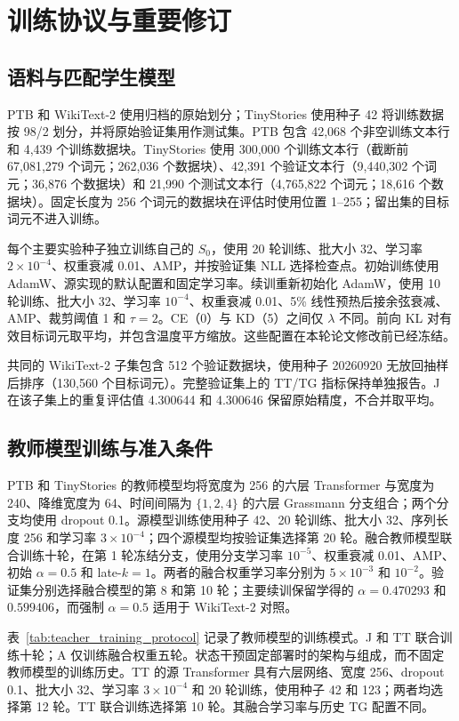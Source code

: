 \section{训练协议与重要修订}\label{app:protocols}

\subsection{语料与匹配学生模型}
PTB 和 WikiText-2 使用归档的原始划分；TinyStories 使用种子 42 将训练数据按 98/2 划分，并将原始验证集用作测试集。PTB 包含 42,068 个非空训练文本行和 4,439 个训练数据块。TinyStories 使用 300,000 个训练文本行（截断前 67,081,279 个词元；262,036 个数据块）、42,391 个验证文本行（9,440,302 个词元；36,876 个数据块）和 21,990 个测试文本行（4,765,822 个词元；18,616 个数据块）。固定长度为 256 个词元的数据块在评估时使用位置 1--255；留出集的目标词元不进入训练。

每个主要实验种子独立训练自己的 $S_0$，使用 20 轮训练、批大小 32、学习率 $2\times10^{-4}$、权重衰减 0.01、AMP，并按验证集 NLL 选择检查点。初始训练使用 AdamW、源实现的默认配置和固定学习率。续训重新初始化 AdamW，使用 10 轮训练、批大小 32、学习率 $10^{-4}$、权重衰减 0.01、5\% 线性预热后接余弦衰减、AMP、裁剪阈值 1 和 $\tau=2$。CE（0）与 KD（5）之间仅 $\lambda$ 不同。前向 KL 对有效目标词元取平均，并包含温度平方缩放。这些配置在本轮论文修改前已经冻结。

共同的 WikiText-2 子集包含 512 个验证数据块，使用种子 20260920 无放回抽样后排序（130,560 个目标词元）。完整验证集上的 TT/TG 指标保持单独报告。J 在该子集上的重复评估值 4.300644 和 4.300646 保留原始精度，不合并取平均。

\subsection{教师模型训练与准入条件}
PTB 和 TinyStories 的教师模型均将宽度为 256 的六层 Transformer 与宽度为 240、降维宽度为 64、时间间隔为 $\{1,2,4\}$ 的六层 Grassmann 分支组合；两个分支均使用 dropout 0.1。源模型训练使用种子 42、20 轮训练、批大小 32、序列长度 256 和学习率 $3\times10^{-4}$；四个源模型均按验证集选择第 20 轮。融合教师模型联合训练十轮，在第 1 轮冻结分支，使用分支学习率 $10^{-5}$、权重衰减 0.01、AMP、初始 $\alpha=0.5$ 和 late-$k=1$。两者的融合权重学习率分别为 $5\times10^{-3}$ 和 $10^{-2}$。验证集分别选择融合模型的第 8 和第 10 轮；主要续训保留学得的 $\alpha=0.470293$ 和 $0.599406$，而强制 $\alpha=0.5$ 适用于 WikiText-2 对照。

表~\ref{tab:teacher_training_protocol} 记录了教师模型的训练模式。J 和 TT 联合训练十轮；A 仅训练融合权重五轮。状态干预固定部署时的架构与组成，而不固定教师模型的训练历史。TT 的源 Transformer 具有六层网络、宽度 256、dropout 0.1、批大小 32、学习率 $3\times10^{-4}$ 和 20 轮训练，使用种子 42 和 123；两者均选择第 12 轮。TT 联合训练选择第 10 轮。其融合学习率与历史 TG 配置不同。


